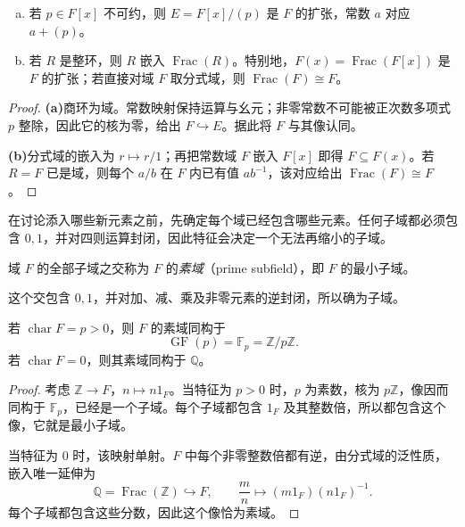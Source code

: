 \documentclass[lang=cn,a4paper,fontset=none,zihao=false,10pt,openany,twoside]{beautybook}
\numberwithin{algorithm}{chapter}
\begin{document}
\Needspace{45mm}
\begin{example}[两种域的构造]
\begin{enumerate}[(a)]
\item 若 $p\in F[x]$ 不可约，则 $E=F[x]/(p)$ 是 $F$ 的扩张，常数 $a$ 对应 $a+(p)$。
\item 若 $R$ 是整环，则 $R$ 嵌入 $\operatorname{Frac}(R)$。特别地，$F(x)=\operatorname{Frac}(F[x])$ 是 $F$ 的扩张；若直接对域 $F$ 取分式域，则 $\operatorname{Frac}(F)\cong F$。
\end{enumerate}
\end{example}
\begin{proof}
\par\smallskip\noindent\textbf{(a)}\quad 商环为域。常数映射保持运算与幺元；非零常数不可能被正次数多项式 $p$ 整除，因此它的核为零，给出 $F\hookrightarrow E$。据此将 $F$ 与其像认同。
\par\smallskip\noindent\textbf{(b)}\quad 分式域的嵌入为 $r\mapsto r/1$；再把常数域 $F$ 嵌入 $F[x]$ 即得 $F\subseteq F(x)$。若 $R=F$ 已是域，则每个 $a/b$ 在 $F$ 内已有值 $ab^{-1}$，该对应给出 $\operatorname{Frac}(F)\cong F$。
\end{proof}

在讨论添入哪些新元素之前，先确定每个域已经包含哪些元素。任何子域都必须包含 $0,1$，并对四则运算封闭，因此特征会决定一个无法再缩小的子域。
\begin{definition}[素域]
域 $F$ 的全部子域之交称为 $F$ 的\emph{素域}（prime subfield），即 $F$ 的最小子域。
\end{definition}
这个交包含 $0,1$，并对加、减、乘及非零元素的逆封闭，所以确为子域。

\begin{proposition}[素域与特征]
若 $\operatorname{char}F=p>0$，则 $F$ 的素域同构于
\[
 \operatorname{GF}(p)=\mathbb F_p=\mathbb Z/p\mathbb Z.
\]
若 $\operatorname{char}F=0$，则其素域同构于 $\mathbb Q$。
\end{proposition}
\begin{proof}
考虑 $\mathbb Z\to F$，$n\mapsto n1_F$。当特征为 $p>0$ 时，$p$ 为素数，核为 $p\mathbb Z$，像因而同构于 $\mathbb F_p$，已经是一个子域。每个子域都包含 $1_F$ 及其整数倍，所以都包含这个像，它就是最小子域。

当特征为 $0$ 时，该映射单射。$F$ 中每个非零整数倍都有逆，由分式域的泛性质，嵌入唯一延伸为
\[
 \mathbb Q=\operatorname{Frac}(\mathbb Z)\hookrightarrow F,
 \qquad \frac mn\longmapsto(m1_F)(n1_F)^{-1}.
\]
每个子域都包含这些分数，因此这个像恰为素域。
\end{proof}
\end{document}
